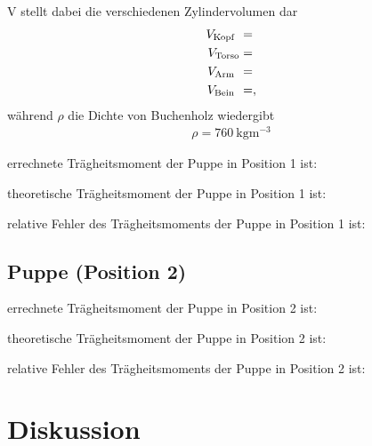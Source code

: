 V stellt dabei die verschiedenen Zylindervolumen dar
\begin{subequations}
\begin{align}
 V_{\text{Kopf\hphantom{o}}} &= \\
 V_{\text{Torso}} &= \\
 V_{\text{Arm\hphantom{o}}} &= \\
 V_{\text{Bein\hphantom{o}}} &= ,
\end{align}
\end{subequations}
während $\rho$ die Dichte von Buchenholz wiedergibt \cite{Holzdichte}
\begin{align}
    \rho = \SI{760}{\kilo\gram\meter\tothe{-3}}
\end{align}

\justifying errechnete Trägheitsmoment der Puppe in Position 1 ist:


\justifying theoretische Trägheitsmoment der Puppe in Position 1 ist:


\justifying relative Fehler des Trägheitsmoments der Puppe in Position 1 ist:


\subsection{Puppe (Position 2)}\justifying %

\justifying errechnete Trägheitsmoment der Puppe in Position 2 ist:


\justifying theoretische Trägheitsmoment der Puppe in Position 2 ist:


\justifying relative Fehler des Trägheitsmoments der Puppe in Position 2 ist:


\section{Diskussion}\justifying

\newpage

\printbibliography
